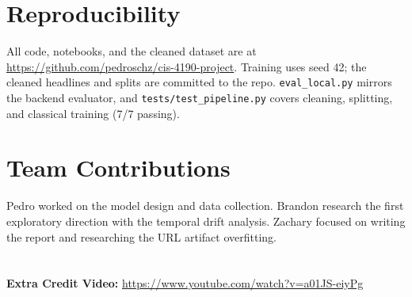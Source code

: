 \documentclass[11pt]{article}
\begin{document}
\section{Reproducibility}
All code, notebooks, and the cleaned dataset are at \url{https://github.com/pedroschz/cis-4190-project}. Training uses seed 42; the cleaned headlines and splits are committed to the repo. \texttt{eval\_local.py} mirrors the backend evaluator, and \texttt{tests/test\_pipeline.py} covers cleaning, splitting, and classical training (7/7 passing).\sloppy

\section{Team Contributions}

Pedro worked on the model design and data collection. Brandon research the first exploratory direction with the temporal drift analysis. Zachary focused on writing the report and researching the URL artifact overfitting. 
\\ \\\\
\textbf{Extra Credit Video:} \url{https://www.youtube.com/watch?v=a01JS-eiyPg}
\end{document}
